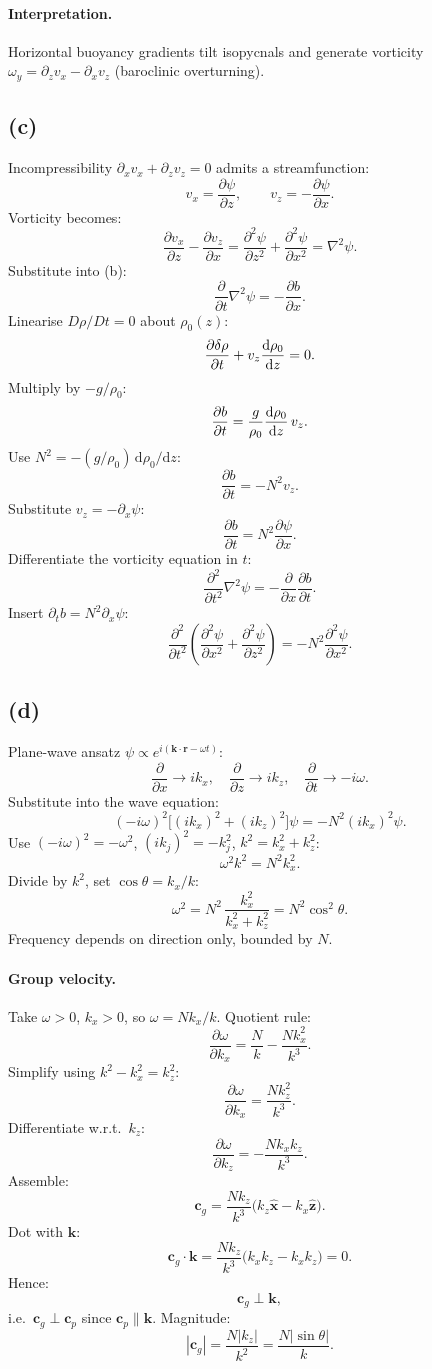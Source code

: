 \documentclass[11pt]{article}
\newcommand{\de}{\mathrm{d}}
\newcommand{\pd}[2]{\frac{\partial #1}{\partial #2}}
\newcommand{\pdd}[2]{\frac{\partial^{2} #1}{\partial #2^{2}}}
\begin{document}
\paragraph{Interpretation.} Horizontal buoyancy gradients tilt isopycnals and generate vorticity $\omega_{y} = \partial_{z}v_{x}-\partial_{x}v_{z}$ (baroclinic overturning).

\subsection*{(c)}

Incompressibility $\partial_{x}v_{x}+\partial_{z}v_{z}=0$ admits a streamfunction:
\[ v_{x} = \pd{\psi}{z},\qquad v_{z} = -\pd{\psi}{x}. \]
Vorticity becomes:
\[ \pd{v_{x}}{z} - \pd{v_{z}}{x} = \pdd{\psi}{z} + \pdd{\psi}{x} = \nabla^{2}\psi. \]
Substitute into (b):
\[ \pd{}{t}\nabla^{2}\psi = -\pd{b}{x}. \]
Linearise $D\rho/Dt = 0$ about $\rho_{0}(z)$:
\[ \pd{\delta\rho}{t} + v_{z}\dv{\rho_{0}}{z} = 0. \]
Multiply by $-g/\rho_{0}$:
\[ \pd{b}{t} = \frac{g}{\rho_{0}}\dv{\rho_{0}}{z}\,v_{z}. \]
Use $N^{2} = -(g/\rho_{0})\,\de\rho_{0}/\de z$:
\[ \pd{b}{t} = -N^{2}v_{z}. \]
Substitute $v_{z} = -\partial_{x}\psi$:
\[ \pd{b}{t} = N^{2}\pd{\psi}{x}. \]
Differentiate the vorticity equation in $t$:
\[ \pdd{}{t}\nabla^{2}\psi = -\pd{}{x}\!\pd{b}{t}. \]
Insert $\partial_{t}b = N^{2}\partial_{x}\psi$:
\[ \boxed{\;\pdd{}{t}\!\left(\pdd{\psi}{x} + \pdd{\psi}{z}\right) = -N^{2}\pdd{\psi}{x}.\;} \]

\subsection*{(d)}

Plane-wave ansatz $\psi \propto e^{i(\bm k\cdot\bm r - \omega t)}$:
\[ \pd{}{x}\to ik_{x},\quad \pd{}{z}\to ik_{z},\quad \pd{}{t}\to -i\omega. \]
Substitute into the wave equation:
\[ (-i\omega)^{2}\bigl[(ik_{x})^{2} + (ik_{z})^{2}\bigr]\psi = -N^{2}(ik_{x})^{2}\psi. \]
Use $(-i\omega)^{2}=-\omega^{2}$, $(ik_{j})^{2}=-k_{j}^{2}$, $k^{2}=k_{x}^{2}+k_{z}^{2}$:
\[ \omega^{2}k^{2} = N^{2}k_{x}^{2}. \]
Divide by $k^{2}$, set $\cos\theta = k_{x}/k$:
\[ \boxed{\;\omega^{2} = N^{2}\,\frac{k_{x}^{2}}{k_{x}^{2}+k_{z}^{2}} = N^{2}\cos^{2}\theta.\;} \]
Frequency depends on direction only, bounded by $N$.

\paragraph{Group velocity.} Take $\omega>0$, $k_{x}>0$, so $\omega = Nk_{x}/k$. Quotient rule:
\[ \pd{\omega}{k_{x}} = \frac{N}{k} - \frac{Nk_{x}^{2}}{k^{3}}. \]
Simplify using $k^{2}-k_{x}^{2}=k_{z}^{2}$:
\[ \pd{\omega}{k_{x}} = \frac{Nk_{z}^{2}}{k^{3}}. \]
Differentiate w.r.t.\ $k_{z}$:
\[ \pd{\omega}{k_{z}} = -\frac{Nk_{x}k_{z}}{k^{3}}. \]
Assemble:
\[ \bm c_{g} = \frac{N k_{z}}{k^{3}}\bigl(k_{z}\hat{\bm x} - k_{x}\hat{\bm z}\bigr). \]
Dot with $\bm k$:
\[ \bm c_{g}\cdot\bm k = \frac{Nk_{z}}{k^{3}}\bigl(k_{x}k_{z} - k_{x}k_{z}\bigr) = 0. \]
Hence:
\[ \boxed{\;\bm c_{g}\perp\bm k,\;} \]
i.e.\ $\bm c_{g}\perp\bm c_{p}$ since $\bm c_{p}\parallel\bm k$. Magnitude:
\[ |\bm c_{g}| = \frac{N|k_{z}|}{k^{2}} = \frac{N|\sin\theta|}{k}. \]
\end{document}
